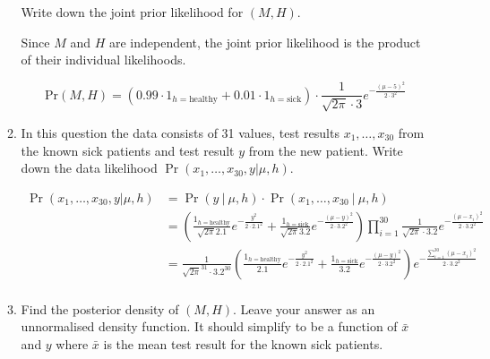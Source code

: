 \documentclass[10pt,\jkfside,a4paper]{article}
\begin{document}
\begin{enumerate}
\begin{enumerate}[label=(\alph*)]
Write down the joint prior likelihood for $(M, H)$.

Since $M$ and $H$ are independent, the joint prior likelihood is the product
of their individual likelihoods.

\[
\text{Pr}(M, H) = \left( 0.99 \cdot 1_{h=\text{healthy}} + 0.01
\cdot 1_{h=\text{sick}} \right) \cdot
\frac{1}{\sqrt{2\pi}\cdot3}e^{-\frac{\left(
\mu - 5 \right)^2}{2\cdot 3^2}}
\]

\item In this question the data consists of 31 values, test results $x_1,
\dots, x_{30}$ from the known sick patients and test result $y$ from the new
patient. Write down the data likelihood $\Pr(x_1, \dots, x_{30}, y| \mu, h)$.

\[
\begin{split}
\Pr(x_1, \dots, x_{30}, y| \mu, h)
&= \Pr(y \ | \ \mu, h) \cdot \Pr(x_1, \dots, x_30 \ | \ \mu, h) \\
&= \left(\frac{1_{h=\text{healthy}}}{\sqrt{2\pi}2.1} e^{-
\frac{y^2}{2 \cdot 2.1^2}} + \frac{1_{h=\text{sick}}}{\sqrt
 {2\pi}3.2} e^{-\frac{\left( \mu - y \right)^2}{2\cdot 3.2^2}} \right)\prod^{30}_{i=1} \frac{1}{\sqrt{2\pi}\cdot
3.2}e^{-\frac{\left( \mu - x_i \right)^2}{2 \cdot 3.2^2}} \\
&= \frac{1}{\sqrt {2\pi}^{31}\cdot3.2^{30}}\left( \frac{
1_{h=\text{healthy}}}{2.1}e^{-\frac{y^2}{{2 \cdot 2.1^2}}} + \frac{
1_{h=\text{sick}}}{3.2} e^{-\frac{\left( \mu - y \right)^2}{{2 \cdot 3.2^2}}}
\right) e^{-\frac{\sum^{30}_{i=1}\left( \mu - x_i \right)^2}{{2 \cdot 3.2^2}}} \\
\end{split}
\]

\item Find the posterior density of $(M, H)$. Leave your answer as an
unnormalised density function. It should simplify to be a function of
$\bar{x}$ and $y$ where $\bar{x}$ is the mean test result for the known sick
patients.


\end{enumerate}
\end{enumerate}
\end{document}
